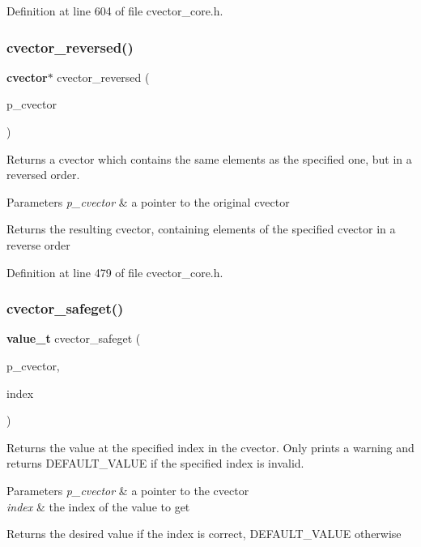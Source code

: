 Definition at line 604 of file cvector\+\_\+core.\+h.

\mbox{\label{cvector__interface_8h_af9185ec558ef030b082daee234f9312a}} 
\subsubsection{cvector\+\_\+reversed()}
{\footnotesize\ttfamily \textbf{ cvector}$\ast$ cvector\+\_\+reversed (\begin{DoxyParamCaption}\item[{\textbf{ cvector} $\ast$}]{p\+\_\+cvector }\end{DoxyParamCaption})}

Returns a cvector which contains the same elements as the specified one, but in a reversed order. 
\begin{DoxyParams}{Parameters}
{\em p\+\_\+cvector} & a pointer to the original cvector \\
\hline
\end{DoxyParams}
\begin{DoxyReturn}{Returns}
the resulting cvector, containing elements of the specified cvector in a reverse order 
\end{DoxyReturn}


Definition at line 479 of file cvector\+\_\+core.\+h.

\mbox{\label{cvector__interface_8h_a41b0ee17ac9cdc9967afb1dca8f9236a}} 
\subsubsection{cvector\+\_\+safeget()}
{\footnotesize\ttfamily \textbf{ value\+\_\+t} cvector\+\_\+safeget (\begin{DoxyParamCaption}\item[{\textbf{ cvector} $\ast$}]{p\+\_\+cvector,  }\item[{\textbf{ index\+\_\+t}}]{index }\end{DoxyParamCaption})}

Returns the value at the specified index in the cvector. Only prints a warning and returns D\+E\+F\+A\+U\+L\+T\+\_\+\+V\+A\+L\+UE if the specified index is invalid. 
\begin{DoxyParams}{Parameters}
{\em p\+\_\+cvector} & a pointer to the cvector \\
\hline
{\em index} & the index of the value to get \\
\hline
\end{DoxyParams}
\begin{DoxyReturn}{Returns}
the desired value if the index is correct, D\+E\+F\+A\+U\+L\+T\+\_\+\+V\+A\+L\+UE otherwise 
\end{DoxyReturn}


